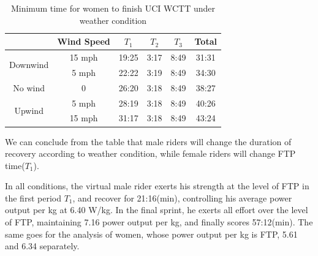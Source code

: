 \begin{table}[h]
	\setlength\tabcolsep{13pt}%
	\setlength{\belowcaptionskip}{0.2cm}
	\centering
	\caption{Minimum time for women to finish UCI WCTT under weather condition}
	\begin{tabular}{c|ccccc}
		\toprule[2pt]
		& Wind Speed & $T_1$  & $T_2$  & $T_3$  & Total \\
		\midrule
		\multirow{2}[2]{*}{Downwind} & 15 mph    & 19:25 & 3:17  & 8:49  & 31:31 \\
		& 5 mph    & 22:22 & 3:19  & 8:49  & 34:30 \\
		\midrule
		No wind & 0     & 26:20 & 3:18  & 8:49  & 38:27 \\
		\midrule
		\multirow{2}[2]{*}{Upwind} & 5 mph     & 28:19 & 3:18  & 8:49  & 40:26 \\
		& 15 mph     & 31:17 & 3:18  & 8:49  & 43:24 \\
		\bottomrule[2pt]
	\end{tabular}%
	\label{wind2}%
\end{table}%
\par We can conclude from the table that male riders will change the duration of recovery according to weather condition, while female riders will change FTP time($T_1$).
\par In all conditions, the virtual male rider exerts his strength at the level of FTP in the first period  $T_1$, and recover for 21:16(min), controlling his average power output per kg at 6.40 W/kg. In the final sprint, he exerts all effort over the level of FTP, maintaining 7.16 power output per kg, and finally scores 57:12(min). The same goes for the analysis of women, whose power output per kg is FTP, 5.61 and 6.34 separately.

